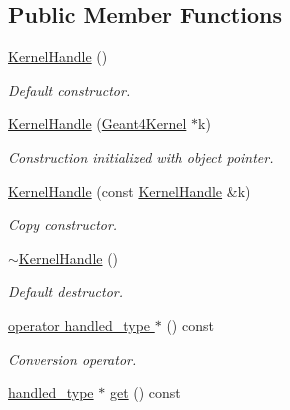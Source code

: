 \subsection*{Public Member Functions}
\begin{DoxyCompactItemize}
\item 
\hyperlink{class_d_d4hep_1_1_simulation_1_1_kernel_handle_a03e3f33ee46b60ab2daaad008ef59418}{KernelHandle} ()
\begin{DoxyCompactList}\small\item\em Default constructor. \item\end{DoxyCompactList}\item 
\hyperlink{class_d_d4hep_1_1_simulation_1_1_kernel_handle_afdab1fdc93f7b1a96c792dd03f97a6ef}{KernelHandle} (\hyperlink{class_d_d4hep_1_1_simulation_1_1_geant4_kernel}{Geant4Kernel} $\ast$k)
\begin{DoxyCompactList}\small\item\em Construction initialized with object pointer. \item\end{DoxyCompactList}\item 
\hyperlink{class_d_d4hep_1_1_simulation_1_1_kernel_handle_a39502e0ffd2e8d1ac079992e9359aee4}{KernelHandle} (const \hyperlink{class_d_d4hep_1_1_simulation_1_1_kernel_handle}{KernelHandle} \&k)
\begin{DoxyCompactList}\small\item\em Copy constructor. \item\end{DoxyCompactList}\item 
\hyperlink{class_d_d4hep_1_1_simulation_1_1_kernel_handle_a66d1b2fafb35c14ac47720c9b184d01d}{$\sim$KernelHandle} ()
\begin{DoxyCompactList}\small\item\em Default destructor. \item\end{DoxyCompactList}\item 
\hyperlink{class_d_d4hep_1_1_simulation_1_1_kernel_handle_a84f90b5670eefe7e6d864bfcb44bb78b}{operator handled\_\-type $\ast$} () const 
\begin{DoxyCompactList}\small\item\em Conversion operator. \item\end{DoxyCompactList}\item 
\hyperlink{class_d_d4hep_1_1_simulation_1_1_geant4_kernel}{handled\_\-type} $\ast$ \hyperlink{class_d_d4hep_1_1_simulation_1_1_kernel_handle_a3e008dbc86ec2f729c49a83efdfdc520}{get} () const 

\end{DoxyCompactItemize}
